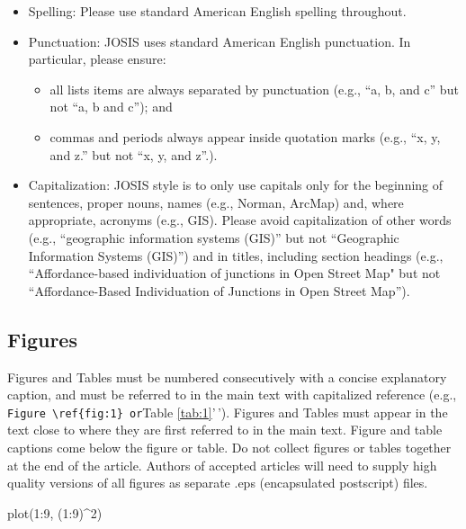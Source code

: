 \documentclass{josis}
\newenvironment{Shaded}{\begin{snugshade}}{\end{snugshade}}
\newcommand{\DecValTok}[1]{\textcolor[rgb]{0.00,0.00,0.81}{#1}}
\newcommand{\FunctionTok}[1]{\textcolor[rgb]{0.00,0.00,0.00}{#1}}
\newcommand{\NormalTok}[1]{#1}
\newcommand{\SpecialCharTok}[1]{\textcolor[rgb]{0.00,0.00,0.00}{#1}}
\begin{document}
\begin{itemize}
\item Spelling: Please use standard American English spelling throughout.
\item Punctuation: JOSIS uses standard American English punctuation. In
particular, please ensure: 
\begin{itemize}
\item all lists items are always separated by
punctuation (e.g., ``a, b, and c'' but not ``a, b and c''); and 
\item commas and periods always appear inside quotation marks (e.g., ``x, y, and z.'' but not ``x, y, and z''.).
\end{itemize}
\item Capitalization: JOSIS style is to only use capitals only for the
beginning of sentences, proper nouns, names (e.g., Norman, ArcMap) and,
where appropriate, acronyms (e.g., GIS). Please avoid capitalization of
other words (e.g., ``geographic information systems (GIS)'' but not
``Geographic Information Systems (GIS)'') and in titles, including section headings (e.g., ``Affordance-based individuation of junctions in Open Street Map" but not ``Affordance-Based Individuation of Junctions in Open Street Map'').
\end{itemize}

\subsection{Figures}

Figures and Tables must be numbered consecutively with a concise
explanatory caption, and must be referred to in the main text with
capitalized reference (e.g.,
\texttt{Figure\ \textbackslash{}ref\{fig:1\}\textquotesingle{}\textquotesingle{}\ or}Table
\ref{tab:1}'\,'). Figures and Tables must appear in the text close to
where they are first referred to in the main text. Figure and table
captions come below the figure or table. Do not collect figures or
tables together at the end of the article. Authors of accepted articles
will need to supply high quality versions of all figures as separate
.eps (encapsulated postscript) files.

\begin{Shaded}
\begin{Highlighting}[]
\FunctionTok{plot}\NormalTok{(}\DecValTok{1}\SpecialCharTok{:}\DecValTok{9}\NormalTok{, (}\DecValTok{1}\SpecialCharTok{:}\DecValTok{9}\NormalTok{)}\SpecialCharTok{\^{}}\DecValTok{2}\NormalTok{)}
\end{Highlighting}
\end{Shaded}
\end{document}
